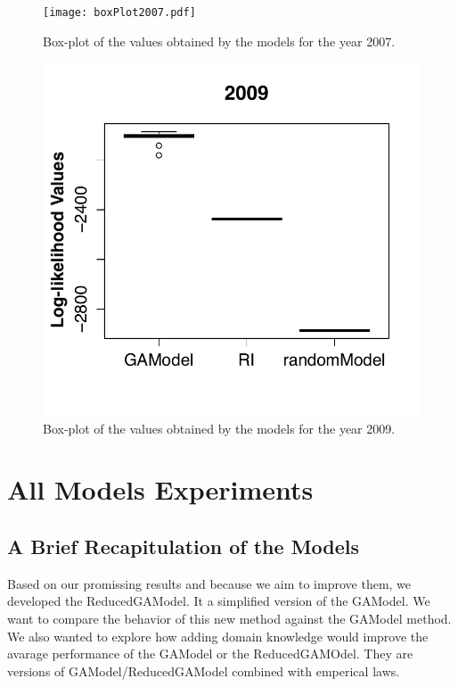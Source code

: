 \begin{figure}[H]
	\centering
	\texttt{[image: boxPlot2007.pdf]}
	\caption{Box-plot of the values obtained by the models for the year 2007.}
	\label{boxPlot2007}
\end{figure}

\begin{figure}[H]
	\centering
	\includegraphics[scale=0.45]{boxPlot2009.pdf}
	\caption{Box-plot of the values obtained by the models for the year 2009.}
	\label{boxPlot2009}
\end{figure}


\section{All Models Experiments}
\subsection{A Brief Recapitulation of the Models}

Based on our promissing results and because we aim to improve them, we developed the ReducedGAModel. It a simplified version of the GAModel. We want to compare the behavior of this new method against the GAModel method.\\

We also wanted to explore how adding domain knowledge would improve the avarage performance of the GAModel or the ReducedGAMOdel. They are versions of GAModel/ReducedGAModel combined with emperical laws.\\ 

